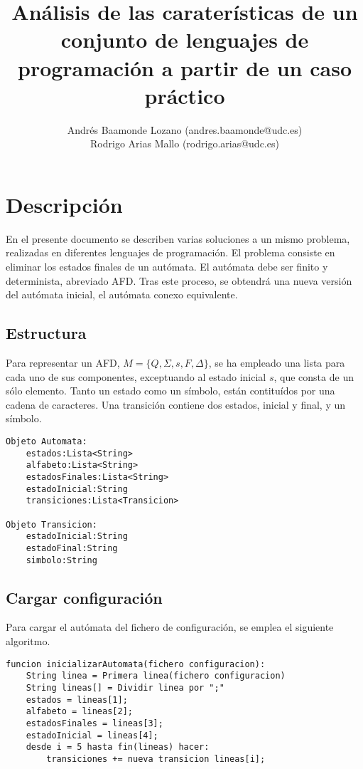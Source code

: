\documentclass[12pt,a4paper]{article}
\title{Análisis de las caraterísticas de un conjunto de lenguajes de
programación a partir de un caso práctico}
\author{Andrés Baamonde Lozano (andres.baamonde@udc.es)\\
	Rodrigo Arias Mallo (rodrigo.arias@udc.es)}
\begin{document}
\maketitle


\section{Descripción}
En el presente documento se describen varias soluciones a un mismo problema,
realizadas en diferentes lenguajes de programación. El problema consiste en
eliminar los estados finales de un autómata. El autómata debe ser finito y
determinista, abreviado AFD. Tras este proceso, se obtendrá una nueva versión
del autómata inicial, el autómata conexo equivalente.  


\subsection{Estructura}
Para representar un AFD, $M = \{ Q, \Sigma, s, F, \Delta \} $, se ha empleado 
una lista para cada uno de sus componentes, exceptuando al estado inicial $s$, 
que consta de un sólo elemento. Tanto un estado como un símbolo, están 
contituídos por una cadena de caracteres. Una transición contiene dos estados, 
inicial y final, y un símbolo.

\begin{lstlisting}
Objeto Automata:
	estados:Lista<String>
	alfabeto:Lista<String>
	estadosFinales:Lista<String>
	estadoInicial:String
	transiciones:Lista<Transicion>

Objeto Transicion:
	estadoInicial:String
	estadoFinal:String
	simbolo:String
\end{lstlisting}


\subsection{Cargar configuración}
Para cargar el autómata del fichero de configuración, se emplea el siguiente 
algoritmo.
\begin{lstlisting}
funcion inicializarAutomata(fichero configuracion):
	String linea = Primera linea(fichero configuracion)
	String lineas[] = Dividir linea por ";"
	estados = lineas[1];
	alfabeto = lineas[2];
	estadosFinales = lineas[3];
	estadoInicial = lineas[4];
	desde i = 5 hasta fin(lineas) hacer:
		transiciones += nueva transicion lineas[i];
\end{lstlisting}
\end{document}
